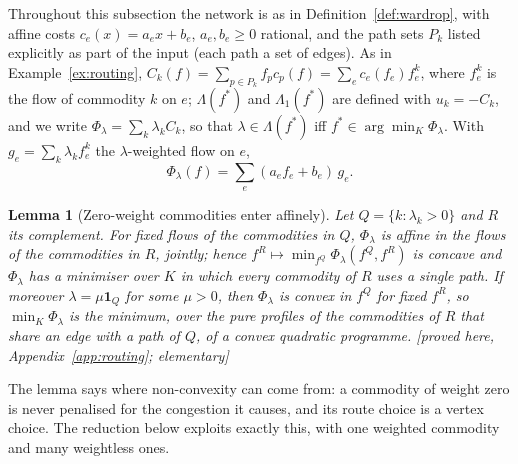 \documentclass[11pt,a4paper]{article}
\theoremstyle{plain}
\newtheorem{lemma}[theorem]{Lemma}
\theoremstyle{definition}
\theoremstyle{remark}
\newcommand{\status}[1]{\textsf{\small [#1]}}
\newcommand{\Lam}{\Lambda}
\newcommand{\Lone}{\Lambda_{1}}
\begin{document}
Throughout this subsection the network is as in Definition~\ref{def:wardrop}, with affine costs $c_e(x)=a_ex+b_e$, $a_e,b_e\ge0$ rational, and the path sets $P_k$ listed explicitly as part of the input (each path a set of edges). As in Example~\ref{ex:routing}, $C_k(f)=\sum_{p\in P_k}f_pc_p(f)=\sum_ec_e(f_e)f^k_e$, where $f^k_e$ is the flow of commodity $k$ on $e$; $\Lam(f^*)$ and $\Lone(f^*)$ are defined with $u_k=-C_k$, and we write $\Phi_\lambda=\sum_k\lambda_kC_k$, so that $\lambda\in\Lam(f^*)$ iff $f^*\in\arg\min_K\Phi_\lambda$. With $g_e=\sum_k\lambda_kf^k_e$ the $\lambda$-weighted flow on $e$,
\begin{equation}\label{eq:phiroute}
\Phi_\lambda(f)=\sum_e(a_ef_e+b_e)\,g_e .
\end{equation}

\begin{lemma}[Zero-weight commodities enter affinely]\label{lem:concave}
Let $Q=\{k:\lambda_k>0\}$ and $R$ its complement. For fixed flows of the commodities in $Q$, $\Phi_\lambda$ is affine in the flows of the commodities in $R$, jointly; hence $f^R\mapsto\min_{f^Q}\Phi_\lambda(f^Q,f^R)$ is concave and $\Phi_\lambda$ has a minimiser over $K$ in which every commodity of $R$ uses a single path. If moreover $\lambda=\mu\mathbf 1_Q$ for some $\mu>0$, then $\Phi_\lambda$ is convex in $f^Q$ for fixed $f^R$, so $\min_K\Phi_\lambda$ is the minimum, over the pure profiles of the commodities of $R$ that share an edge with a path of $Q$, of a convex quadratic programme. \status{proved here, Appendix~\ref{app:routing}; elementary}
\end{lemma}
The lemma says where non-convexity can come from: a commodity of weight zero is never penalised for the congestion it causes, and its route choice is a vertex choice. The reduction below exploits exactly this, with one weighted commodity and many weightless ones.
\end{document}
